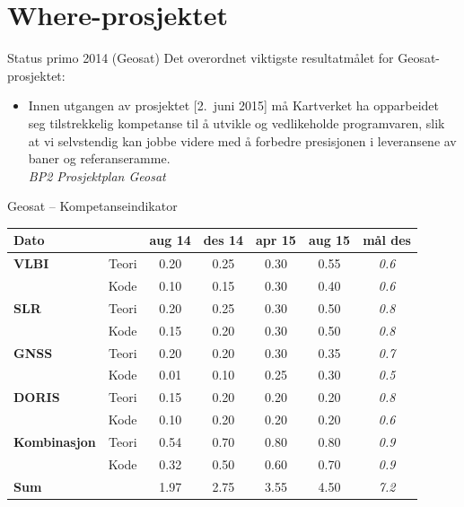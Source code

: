 \documentclass[12pt,table,t]{beamer}
\begin{document}
\part{Where-prosjektet}

\begin{frame}{Status primo 2014 (Geosat)}
  Det overordnet viktigste resultatmålet for Geosat-prosjektet:

  \begin{itemize}
  \item Innen utgangen av prosjektet [2.\ juni 2015] må Kartverket ha opparbeidet seg tilstrekkelig kompetanse til å
    utvikle og vedlikeholde programvaren, slik at vi selvstendig kan jobbe videre med å forbedre presisjonen i
    leveransene av baner og referanseramme.\\
    \hfill\emph{BP2 Prosjektplan Geosat}
  \end{itemize}
\end{frame}


\begin{frame}[c]{Geosat -- Kompetanseindikator}
  \footnotesize
  \begin{tabularx}{\textwidth}{Xr|c|c|c|c|c}
    \textbf{Dato} & & \textbf{aug 14} & \textbf{des 14} & \textbf{apr 15} & \textbf{aug 15} & \textbf{mål des} \\
    \hline
    \textbf{VLBI}        & Teori & 0.20 & 0.25 & 0.30 & 0.55 & \emph{0.6} \\
                         & Kode  & 0.10 & 0.15 & 0.30 & 0.40 & \emph{0.6} \\
    \hline
    \textbf{SLR}         & Teori & 0.20 & 0.25 & 0.30 & 0.50 & \emph{0.8} \\
                         & Kode  & 0.15 & 0.20 & 0.30 & 0.50 & \emph{0.8} \\
    \hline
    \textbf{GNSS}        & Teori & 0.20 & 0.20 & 0.30 & 0.35 & \emph{0.7} \\
                         & Kode  & 0.01 & 0.10 & 0.25 & 0.30 & \emph{0.5} \\
    \hline
    \textbf{DORIS}       & Teori & 0.15 & 0.20 & 0.20 & 0.20 & \emph{0.8} \\
                         & Kode  & 0.10 & 0.20 & 0.20 & 0.20 & \emph{0.6} \\
    \hline
    \textbf{Kombinasjon} & Teori & 0.54 & 0.70 & 0.80 & 0.80 & \emph{0.9} \\
                         & Kode  & 0.32 & 0.50 & 0.60 & 0.70 & \emph{0.9} \\
    \hline
    \textbf{Sum}         &       & 1.97 & 2.75 & 3.55 & 4.50 & \emph{7.2} \\
  \end{tabularx}
\end{frame}
\end{document}
